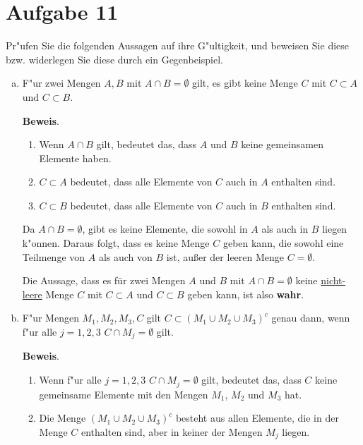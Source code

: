 \documentclass[10pt, a4paper, oneside]{article}
\begin{document}
\pagebreak

\section{Aufgabe 11}

Pr"ufen Sie die folgenden Aussagen auf ihre G"ultigkeit, und beweisen Sie diese
bzw. widerlegen Sie diese durch ein Gegenbeispiel.

\begin{enumerate}[(a)]
    \item F"ur zwei Mengen $A,B$ mit $A \cap B = \emptyset$ gilt, es gibt keine
        Menge $C$ mit $C \subset A$ und $C \subset B$.

        \textbf{Beweis}.
        \begin{enumerate}[-]
            \item Wenn $A \cap B$ gilt, bedeutet das, dass $A$ und $B$ keine gemeinsamen Elemente haben.
            \item $C \subset A$ bedeutet, dass alle Elemente von $C$ auch in $A$ enthalten sind.
            \item $C \subset B$ bedeutet, dass alle Elemente von $C$ auch in $B$ enthalten sind.
        \end{enumerate}

        Da $A \cap B = \emptyset$, gibt es keine Elemente, die sowohl
        in $A$ als auch in $B$ liegen k"onnen. Daraus folgt, dass es
        keine Menge $C$ geben kann, die sowohl eine Teilmenge von $A$
        als auch von $B$ ist, au{\ss}er der leeren Menge  $C =
        \emptyset$.

        Die Aussage, dass es für zwei Mengen $A$ und $B$ mit $A \cap B = \emptyset$
        keine \underline{nicht-leere} Menge $C$ mit $C \subset A$ und $C
        \subset B$ geben kann, ist also \textbf{wahr}.

    \item F"ur Mengen $M_1, M_2, M_3, C$ gilt $C \subset (M_1 \cup M_2 \cup
        M_3)^c$ genau dann, wenn f"ur alle $j = 1, 2, 3$ $C \cap M_j = \emptyset$
        gilt.

        \textbf{Beweis}.
        \begin{enumerate}[-]
            \item Wenn f"ur alle $j = 1, 2, 3$ $C \cap M_j = \emptyset$ gilt,
                bedeutet das, dass $C$ keine gemeinsame Elemente mit den Mengen
                $M_1$, $M_2$ und $M_3$ hat.
            \item Die Menge $(M_1 \cup M_2 \cup M_3)^c$ besteht aus allen
                Elemente, die in der Menge $C$ enthalten sind, aber in keiner
                der Mengen $M_j$ liegen.
        \end{enumerate}


\end{enumerate}
\end{document}
